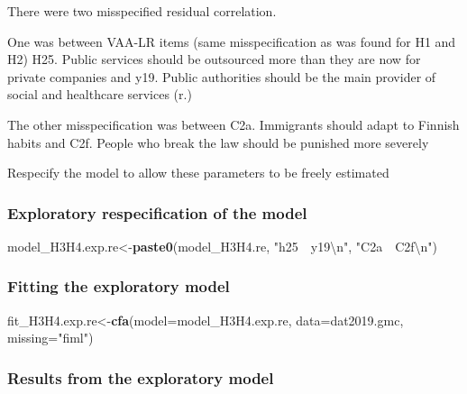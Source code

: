 \documentclass[
]{article}
\newenvironment{Shaded}{\begin{snugshade}}{\end{snugshade}}
\newcommand{\CharTok}[1]{\textcolor[rgb]{0.31,0.60,0.02}{#1}}
\newcommand{\DataTypeTok}[1]{\textcolor[rgb]{0.13,0.29,0.53}{#1}}
\newcommand{\KeywordTok}[1]{\textcolor[rgb]{0.13,0.29,0.53}{\textbf{#1}}}
\newcommand{\NormalTok}[1]{#1}
\newcommand{\StringTok}[1]{\textcolor[rgb]{0.31,0.60,0.02}{#1}}
\begin{document}
There were two misspecified residual correlation.

One was between VAA-LR items (same misspecification as was found for H1
and H2) H25. Public services should be outsourced more than they are now
for private companies and y19. Public authorities should be the main
provider of social and healthcare services (r.)

The other misspecification was between C2a. Immigrants should adapt to
Finnish habits and C2f. People who break the law should be punished more
severely

Respecify the model to allow these parameters to be freely estimated

\hypertarget{exploratory-respecification-of-the-model-2}{%
\subsubsection{Exploratory respecification of the
model}\label{exploratory-respecification-of-the-model-2}}

\begin{Shaded}
\begin{Highlighting}[]
\NormalTok{model_H3H4.exp.re<-}\KeywordTok{paste0}\NormalTok{(model_H3H4.re,}
                      \StringTok{"h25~~y19}\CharTok{\textbackslash{}n}\StringTok{"}\NormalTok{,}
                      \StringTok{"C2a~~C2f}\CharTok{\textbackslash{}n}\StringTok{"}\NormalTok{)}
\end{Highlighting}
\end{Shaded}

\hypertarget{fitting-the-exploratory-model-1}{%
\subsubsection{Fitting the exploratory
model}\label{fitting-the-exploratory-model-1}}

\begin{Shaded}
\begin{Highlighting}[]
\NormalTok{fit_H3H4.exp.re<-}\KeywordTok{cfa}\NormalTok{(}\DataTypeTok{model=}\NormalTok{model_H3H4.exp.re,}
              \DataTypeTok{data=}\NormalTok{dat2019.gmc,}
              \DataTypeTok{missing=}\StringTok{"fiml"}\NormalTok{)}
\end{Highlighting}
\end{Shaded}

\hypertarget{results-from-the-exploratory-model-1}{%
\subsubsection{Results from the exploratory
model}\label{results-from-the-exploratory-model-1}}
\end{document}
